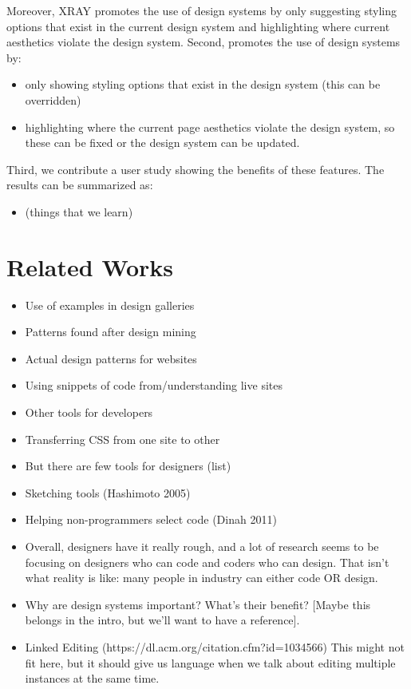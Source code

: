 \documentclass{sigchi}
\begin{document}
Moreover, XRAY promotes the use of design systems by only suggesting styling options that exist in the current design system and highlighting where current aesthetics violate the design system. 
Second, promotes the use of design systems by: 
\begin{itemize}
    \item only showing styling options that exist in the design system (this can be overridden) 
    \item highlighting where the current page aesthetics violate the design system, so these can be fixed or the design system can be updated.
\end{itemize}{}

Third, we contribute a user study showing the benefits of these features. The results can be summarized as: 
\begin{itemize}
    \item (things that we learn)
\end{itemize}

\section{Related Works}



\begin{itemize}
    \item Use of examples in design galleries
    \item Patterns found after design mining
    \item Actual design patterns for websites
    \item Using snippets of code from/understanding live sites
    \item Other tools for developers
    \item Transferring CSS from one site to other
    \item But there are few tools for designers (list)
    \item Sketching tools (Hashimoto 2005)
    \item Helping non-programmers select code (Dinah 2011)
    \item Overall, designers have it really rough, and a lot of research seems to be focusing on designers who can code and coders who can design. That isn’t what reality is like: many people in industry can either code OR design. 
    \item Why are design systems important? What’s their benefit? [Maybe this belongs in the intro, but we’ll want to have a reference].
    \item Linked Editing (https://dl.acm.org/citation.cfm?id=1034566) This might not fit here, but it should give us language when we talk about editing multiple instances at the same time.
\end{itemize}
\end{document}
